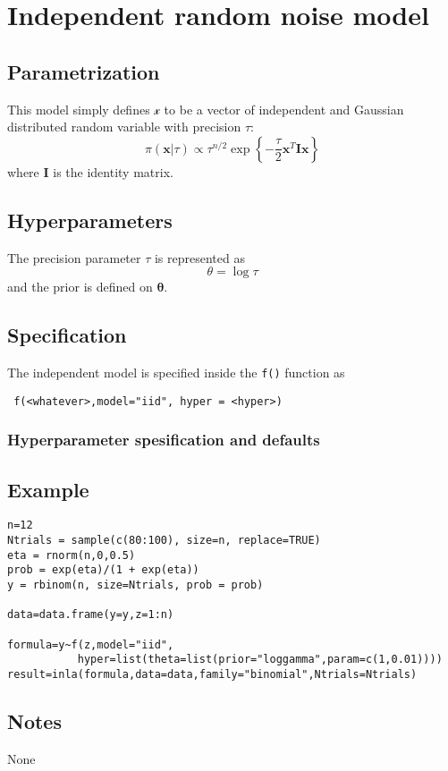 \documentclass[a4paper,11pt]{article}
\begin{document}
\section*{Independent random noise model}

\subsection*{Parametrization}

This model simply defines $\mathcal{x}$ to be a vector of independent
and Gaussian distributed random variable with precision $\tau$:
\[
\pi(\mathbf{x}|\tau) \propto \tau^{n/2}\exp\left\{
  -\frac{\tau}{2}\mathbf{x}^T\mathbf{I}\mathbf{x} \right\}
\]
where $\mathbf{I}$ is the identity matrix.
\subsection*{Hyperparameters}

The precision parameter $\tau$ is represented as
\begin{displaymath}
    \theta =\log \tau
\end{displaymath}
and the prior is defined on $\mathbf{\theta}$.

\subsection*{Specification}

The independent model is specified inside the {\tt f()} function as
\begin{verbatim}
 f(<whatever>,model="iid", hyper = <hyper>)
\end{verbatim}

\subsubsection*{Hyperparameter spesification and defaults}


\subsection*{Example}

\begin{verbatim}
n=12
Ntrials = sample(c(80:100), size=n, replace=TRUE)
eta = rnorm(n,0,0.5)
prob = exp(eta)/(1 + exp(eta))
y = rbinom(n, size=Ntrials, prob = prob)

data=data.frame(y=y,z=1:n)

formula=y~f(z,model="iid",
           hyper=list(theta=list(prior="loggamma",param=c(1,0.01))))
result=inla(formula,data=data,family="binomial",Ntrials=Ntrials)
\end{verbatim}


\subsection*{Notes}

None
\end{document}
